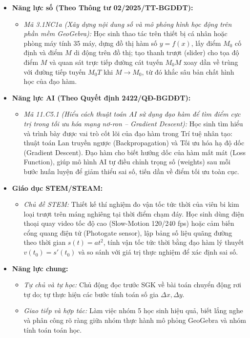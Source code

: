 \documentclass[12pt, a4paper]{article}
\begin{document}
\begin{itemize}[leftmargin=1.2cm]
    \item \textbf{Năng lực số (Theo Thông tư 02/2025/TT-BGDĐT):}
    \begin{itemize}[leftmargin=0.6cm]
        \item \textit{Mã 3.1NC1a (Xây dựng nội dung số và mô phỏng hình học động trên phần mềm GeoGebra):} Học sinh thao tác trên thiết bị cá nhân hoặc phòng máy tính 35 máy, dựng đồ thị hàm số $y = f(x)$, lấy điểm $M_0$ cố định và điểm $M$ di động trên đồ thị; tạo thanh trượt (slider) cho tọa độ điểm $M$ và quan sát trực tiếp đường cát tuyến $M_0M$ xoay dần về trùng với đường tiếp tuyến $M_0T$ khi $M \to M_0$, từ đó khắc sâu bản chất hình học của đạo hàm.
    \end{itemize}

    \item \textbf{Năng lực AI (Theo Quyết định 2422/QĐ-BGDĐT):}
    \begin{itemize}[leftmargin=0.6cm]
        \item \textit{Mã 11.C5.1 (Hiểu cách thuật toán AI sử dụng đạo hàm để tìm điểm cực trị trong tối ưu hóa mạng nơ-ron -- Gradient Descent):} Học sinh tìm hiểu và trình bày được vai trò cốt lõi của đạo hàm trong Trí tuệ nhân tạo: thuật toán Lan truyền ngược (Backpropagation) và Tối ưu hóa hạ độ dốc (Gradient Descent). Đạo hàm cho biết hướng dốc của hàm mất mát (Loss Function), giúp mô hình AI tự điều chỉnh trọng số (weights) sau mỗi bước huấn luyện để giảm thiểu sai số, tiến dần về điểm tối ưu toàn cục.
    \end{itemize}

    \item \textbf{Giáo dục STEM/STEAM:}
    \begin{itemize}[leftmargin=0.6cm]
        \item \textit{Chủ đề STEM:} Thiết kế thí nghiệm đo vận tốc tức thời của viên bi kim loại trượt trên máng nghiêng tại thời điểm chạm đáy. Học sinh dùng điện thoại quay video tốc độ cao (Slow-Motion 120/240 fps) hoặc cảm biến cổng quang điện tử (Photogate sensor), lập bảng số liệu quãng đường theo thời gian $s(t) = a t^2$, tính vận tốc tức thời bằng đạo hàm lý thuyết $v(t_0) = s'(t_0)$ và so sánh với giá trị thực nghiệm để xác định sai số.
    \end{itemize}

    \item \textbf{Năng lực chung:}
    \begin{itemize}[leftmargin=0.6cm]
        \item \textit{Tự chủ và tự học:} Chủ động đọc trước SGK về bài toán chuyển động rơi tự do; tự thực hiện các bước tính toán số gia $\Delta x, \Delta y$.
        \item \textit{Giao tiếp và hợp tác:} Làm việc nhóm 5 học sinh hiệu quả, biết lắng nghe và phân công rõ ràng giữa nhóm thực hành mô phỏng GeoGebra và nhóm tính toán toán học.
    \end{itemize}
\end{itemize}
\end{document}
